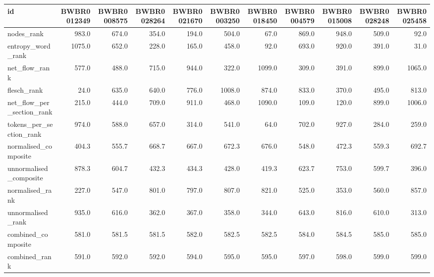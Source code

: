 \begin{tabular}{lrrrrrrrrrr}
\toprule
id & BWBR0012349 & BWBR0008575 & BWBR0028264 & BWBR0021670 & BWBR0003250 & BWBR0018450 & BWBR0004579 & BWBR0015008 & BWBR0028248 & BWBR0025458 \\
\midrule
nodes\_rank & 983.0 & 674.0 & 354.0 & 194.0 & 504.0 & 67.0 & 869.0 & 948.0 & 509.0 & 92.0 \\
\cline{1-11}
entropy\_word\_rank & 1075.0 & 652.0 & 228.0 & 165.0 & 458.0 & 92.0 & 693.0 & 920.0 & 391.0 & 31.0 \\
\cline{1-11}
net\_flow\_rank & 577.0 & 488.0 & 715.0 & 944.0 & 322.0 & 1099.0 & 309.0 & 391.0 & 899.0 & 1065.0 \\
\cline{1-11}
flesch\_rank & 24.0 & 635.0 & 640.0 & 776.0 & 1008.0 & 874.0 & 833.0 & 370.0 & 495.0 & 813.0 \\
\cline{1-11}
net\_flow\_per\_section\_rank & 215.0 & 444.0 & 709.0 & 911.0 & 468.0 & 1090.0 & 109.0 & 120.0 & 899.0 & 1006.0 \\
\cline{1-11}
tokens\_per\_section\_rank & 974.0 & 588.0 & 657.0 & 314.0 & 541.0 & 64.0 & 702.0 & 927.0 & 284.0 & 259.0 \\
\cline{1-11}
normalised\_composite & 404.3 & 555.7 & 668.7 & 667.0 & 672.3 & 676.0 & 548.0 & 472.3 & 559.3 & 692.7 \\
\cline{1-11}
unnormalised\_composite & 878.3 & 604.7 & 432.3 & 434.3 & 428.0 & 419.3 & 623.7 & 753.0 & 599.7 & 396.0 \\
\cline{1-11}
normalised\_rank & 227.0 & 547.0 & 801.0 & 797.0 & 807.0 & 821.0 & 525.0 & 353.0 & 560.0 & 857.0 \\
\cline{1-11}
unnormalised\_rank & 935.0 & 616.0 & 362.0 & 367.0 & 358.0 & 344.0 & 643.0 & 816.0 & 610.0 & 313.0 \\
\cline{1-11}
combined\_composite & 581.0 & 581.5 & 581.5 & 582.0 & 582.5 & 582.5 & 584.0 & 584.5 & 585.0 & 585.0 \\
\cline{1-11}
combined\_rank & 591.0 & 592.0 & 592.0 & 594.0 & 595.0 & 595.0 & 597.0 & 598.0 & 599.0 & 599.0 \\
\cline{1-11}
\bottomrule
\end{tabular}
